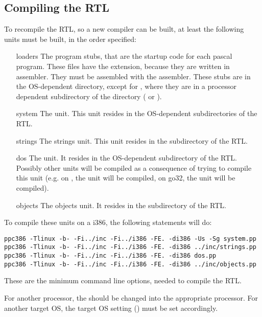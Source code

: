 \subsection{Compiling the RTL}
To recompile the RTL, so a new compiler can be built, at least the following
units must be built, in the order specified:
\begin{enumerate}
\item[loaders] The program stubs, that are the startup code for each pascal
program. These files have the  extension, because they are written
in assembler. They must be assembled with the \gnu {} assembler. These stubs
are in the OS-dependent directory, except for \linux, where they are in a
processor dependent subdirectory of the \linux directory ( or
).
\item[system] The  unit. This unit resides in the OS-dependent 
subdirectories of the RTL.
\item[strings] The strings unit. This unit resides in the 
subdirectory of the RTL.
\item[dos] The  unit. It resides in the OS-dependent subdirectory
of the RTL. Possibly other units will be compiled as a consequence of trying
to compile this unit (e.g. on \linux, the  unit will be
compiled, on go32, the  unit will be compiled).
\item[objects] The objects unit. It resides in the  subdirectory
of the RTL.
\end{enumerate}
To compile these units on a i386, the following statements will do:
\begin{verbatim}
ppc386 -Tlinux -b- -Fi../inc -Fi../i386 -FE. -di386 -Us -Sg system.pp
ppc386 -Tlinux -b- -Fi../inc -Fi../i386 -FE. -di386 ../inc/strings.pp
ppc386 -Tlinux -b- -Fi../inc -Fi../i386 -FE. -di386 dos.pp
ppc386 -Tlinux -b- -Fi../inc -Fi../i386 -FE. -di386 ../inc/objects.pp
\end{verbatim}
These are the minimum command line options, needed to compile the RTL.

For another processor, the  should be changed into the appropriate
processor. For another target OS, the target OS setting () must be 
set accordingly.

